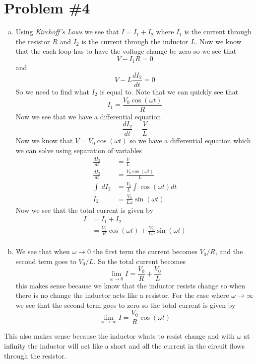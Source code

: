 \documentclass[11pt]{article}
\numberwithin{equation}{section}
\begin{document}
\section{Problem \#4}
\begin{enumerate}[(a)]
\item
Using \emph{Kirchoff's Laws} we see that $I = I_1+I_2$ where $I_1$ is the current through the resistor $R$ and $I_2$ is the current through the inductor $L$. Now we know that the each loop has to have the voltage change be zero so we see that
$$V-I_1R = 0$$
and 
$$V-L\frac{dI_2}{dt} = 0$$
So we need to find what $I_2$ is equal to. Note that we can quickly see that
$$I_1 = \frac{V_0\cos(\omega t)}{R}$$
Now we see that we have a differential equation 
$$\frac{dI_2}{dt} = \frac{V}{L}$$
Now we know that $V = V_0\cos(\omega t)$ so we have a differential equation which we can solve using separation of variables
\begin{align*}
\frac{dI_2}{dt} &= \frac{V}{L}\\
\frac{dI_2}{dt} &= \frac{V_0\cos(\omega t)}{L}\\
\int\ dI_2 &= \frac{V_0}{L}\int\cos(\omega t)dt\\
I_2 &= \frac{V_0}{L\omega}\sin(\omega t)
\end{align*}
Now we see that the total current is given by
\begin{align*}
I &= I_1+I_2\\
&= \frac{V_0}{R}\cos(\omega t) + \frac{V_0}{L\omega}\sin(\omega t)\\
\end{align*}

\item
We see that when $\omega\rightarrow 0$ the first term the current becomes $V_0/R$, and the second term goes to $V_0/L$. So the total current becomes
$$\lim_{\omega\rightarrow0} I = \frac{V_0}{R}+\frac{V_0}{L}$$
this makes sense because we know that the inductor resists change so when there is no change the inductor acts like a resistor. For the case where $\omega\rightarrow\infty$ we see that the second term goes to zero so the total current is given by
$$\lim_{\omega\rightarrow\infty} I = \frac{V_0}{R}\cos(\omega t)$$
\end{enumerate}
This also makes sense because the inductor whats to resist change and with $\omega$ at infinity the inductor will act like a short and all the current in the circuit flows through the resistor.
\end{document}
